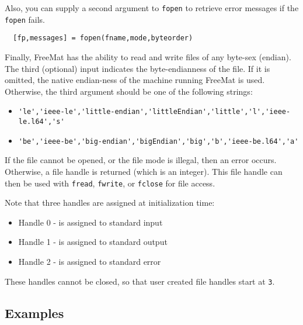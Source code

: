 Also, you can supply a second argument to \verb|fopen| to retrieve error
messages if the \verb|fopen| fails.
\begin{verbatim}
  [fp,messages] = fopen(fname,mode,byteorder)
\end{verbatim}

Finally, FreeMat has the ability to read and write files of any
byte-sex (endian).  The third (optional) input indicates the 
byte-endianness of the file.  If it is omitted, the native endian-ness
of the machine running FreeMat is used.  Otherwise, the third
argument should be one of the following strings:
\begin{itemize}
\item  \verb|'le','ieee-le','little-endian','littleEndian','little','l','ieee-le.l64','s'|

\item  \verb|'be','ieee-be','big-endian','bigEndian','big','b','ieee-be.l64','a'|

\end{itemize}
	
If the file cannot be opened, or the file mode is illegal, then
an error occurs. Otherwise, a file handle is returned (which is
an integer).  This file handle can then be used with \verb|fread|,
\verb|fwrite|, or \verb|fclose| for file access.

Note that three handles are assigned at initialization time:
\begin{itemize}
\item  Handle 0 - is assigned to standard input

\item  Handle 1 - is assigned to standard output

\item  Handle 2 - is assigned to standard error

\end{itemize}
These handles cannot be closed, so that user created file handles start at \verb|3|.

\subsection{Examples}

